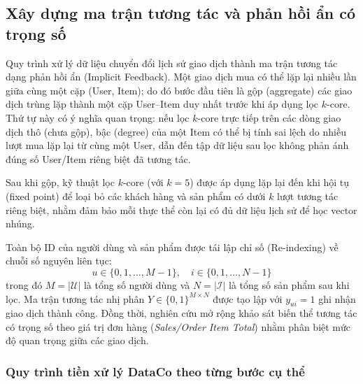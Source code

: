 \subsection{Xây dựng ma trận tương tác và phản hồi ẩn có trọng số}
\label{subsec:interaction_matrix}

Quy trình xử lý dữ liệu chuyển đổi lịch sử giao dịch thành ma trận tương tác dạng phản hồi ẩn (Implicit Feedback). Một giao dịch mua có thể lặp lại nhiều lần giữa cùng một cặp (User, Item); do đó bước đầu tiên là gộp (aggregate) các giao dịch trùng lặp thành một cặp User--Item duy nhất trước khi áp dụng lọc $k$-core. Thứ tự này có ý nghĩa quan trọng: nếu lọc $k$-core trực tiếp trên các dòng giao dịch thô (chưa gộp), bậc (degree) của một Item có thể bị tính sai lệch do nhiều lượt mua lặp lại từ cùng một User, dẫn đến tập dữ liệu sau lọc không phản ánh đúng số User/Item riêng biệt đã tương tác.

Sau khi gộp, kỹ thuật lọc $k$-core (với $k = 5$) được áp dụng lặp lại đến khi hội tụ (fixed point) để loại bỏ các khách hàng và sản phẩm có dưới $k$ lượt tương tác riêng biệt, nhằm đảm bảo mỗi thực thể còn lại có đủ dữ liệu lịch sử để học vector nhúng.

Toàn bộ ID của người dùng và sản phẩm được tái lập chỉ số (Re-indexing) về chuỗi số nguyên liên tục:
\begin{equation}
    u \in \{0, 1, \dots, M-1\}, \quad i \in \{0, 1, \dots, N-1\}
\end{equation}
trong đó $M = |\mathcal{U}|$ là tổng số người dùng và $N = |\mathcal{I}|$ là tổng số sản phẩm sau khi lọc. Ma trận tương tác nhị phân $Y \in \{0, 1\}^{M \times N}$ được tạo lập với $y_{ui} = 1$ ghi nhận giao dịch thành công. Đồng thời, nghiên cứu mở rộng khảo sát biến thể tương tác có trọng số theo giá trị đơn hàng (\textit{Sales/Order Item Total}) nhằm phân biệt mức độ quan trọng giữa các giao dịch.

\subsubsection{Quy trình tiền xử lý DataCo theo từng bước cụ thể}
\label{subsubsec:dataco_steps}

